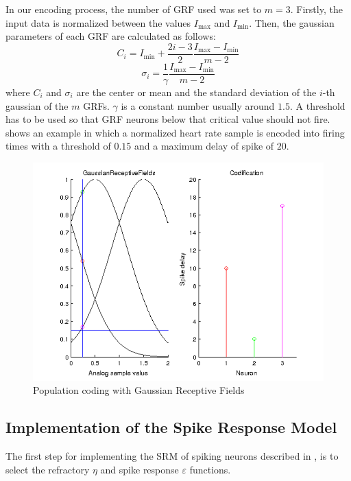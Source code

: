In our encoding process, the number of GRF used was set to $m=3$. Firstly, the input data is normalized between the values $I_{\text{max}}$ and $I_{\text{min}}$. Then, the gaussian parameters of each GRF are calculated as follows:
\begin{equation}
C_{i}=I_{\text{min}}+\frac{2i-3}{2}\frac{I_{\text{max}}-I_{\text{min}}}{m-2}
\end{equation}
\begin{equation}
\sigma_{i}=\frac{1}{\gamma}\frac{I_{\text{max}}-I_{\text{min}}}{m-2}
\end{equation}
where $C_{i}$ and $\sigma_{i}$ are the center or mean and the standard deviation of the $i$-th gaussian of the $m$ GRFs. $\gamma$ is a constant number usually around $1.5$. A threshold has to be used so that GRF neurons below that critical value should not fire.
 shows an example in which a normalized heart rate sample is encoded into firing times with a threshold of $0.15$ and a maximum delay of spike of $20$.

\begin{figure}[!ht]
\centering
\includegraphics[width=0.9\columnwidth]{images/results/encondingINnorm.png}
\caption{Population coding with Gaussian Receptive Fields}
\label{fig:grfencoding}
\end{figure}





\subsection{Implementation of the Spike Response Model}
\label{subsec:srmimplementation}
The first step for implementing the SRM of spiking neurons described in , is to select the refractory $\eta$ and spike response $\varepsilon$ functions. 

